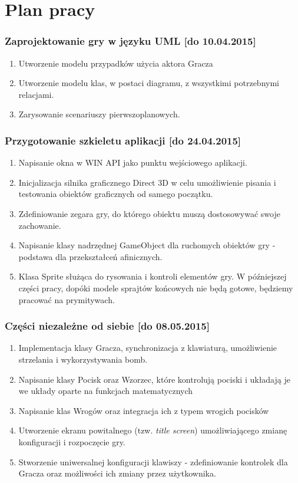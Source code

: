 \documentclass[a4paper,twoside]{article}
\begin{document}
	\newpage
	
	\part{Plan pracy}
	\section{Zaprojektowanie gry w języku UML [do 10.04.2015]}
	\begin{enumerate}[label=\alph*.]
		\item Utworzenie modelu przypadków użycia aktora Gracza
		\item Utworzenie modelu klas, w postaci diagramu, z wszystkimi potrzebnymi relacjami.
		\item Zarysowanie scenariuszy pierwszoplanowych.
	\end{enumerate}
	\section{Przygotowanie szkieletu aplikacji [do 24.04.2015]}
	\begin{enumerate}[label=\alph*.]
		\item Napisanie okna w WIN API jako punktu wejściowego aplikacji.
		\item Inicjalizacja silnika graficznego Direct 3D w celu umożliwienie pisania i testowania obiektów graficznych od samego początku.
		\item Zdefiniowanie zegara gry, do którego obiektu muszą dostosowywać swoje zachowanie.
		\item Napisanie klasy nadrzędnej GameObject dla ruchomych obiektów gry - podstawa dla przekształceń afinicznych.
		\item Klasa Sprite służąca do rysowania i kontroli elementów gry. W późniejszej części pracy, dopóki modele sprajtów końcowych nie będą gotowe, będziemy pracować na prymitywach.
	\end{enumerate}
	\section{Części niezależne od siebie [do 08.05.2015]}
	\begin{enumerate}[label=\alph*.]
		\item Implementacja klasy Gracza, synchronizacja z klawiaturą, umożliwienie strzelania i wykorzystywania bomb.
		\item Napisanie klasy Pocisk oraz Wzorzec, które kontrolują pociski i układają je we układy oparte na funkcjach matematycznych
		\item Napisanie klas Wrogów oraz integracja ich z typem wrogich pocisków
		\item Utworzenie ekranu powitalnego (tzw. \emph{title screen}) umożliwiającego zmianę konfiguracji i rozpoczęcie gry.
		\item Stworzenie uniwersalnej konfiguracji klawiszy - zdefiniowanie kontrolek dla Gracza oraz możliwości ich zmiany przez użytkownika.
	\end{enumerate}
\end{document}
